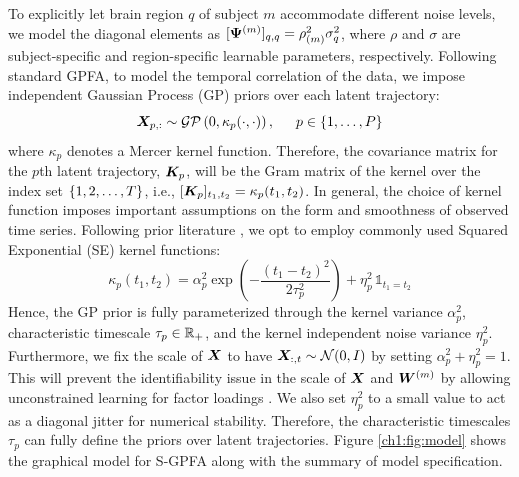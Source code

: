 To explicitly let brain region $q$ of subject $m$ accommodate different noise levels, we model the diagonal elements as $[\bm{\Psi}^{(m)}]_{q, q} = \rho_{(m)}^2 \sigma_{q}^2$, where $\rho$ and $\sigma$ are subject-specific and region-specific learnable parameters, respectively. Following standard GPFA, to model the temporal correlation of the data, we impose independent Gaussian Process (GP) priors over each latent trajectory:
\begin{equation}
    \bm{X}_{p, :} \sim \mathcal{GP}\left(0, \kappa_p(\cdot , \cdot) \right), \hspace{1.5em} p \in \{1, \ldots, P\}
\end{equation}
where $\kappa_p$ denotes a Mercer kernel function. Therefore, the covariance matrix for the $p$th latent trajectory, $\bm{K}_p$, will be the Gram matrix of the kernel over the index set $\{1, 2, \ldots, T\}$, i.e., $[\bm{K}_p]_{t_1,t_2} = \kappa_p(t_1, t_2)$. In general, the choice of kernel function imposes important assumptions on the form and smoothness of observed time series. Following prior literature \cite{infraslow,lfgp}, we opt to employ commonly used Squared Exponential (SE) kernel functions:
\begin{equation}
    \kappa_p (t_1, t_2) = \alpha_p^2 \exp \left( -\frac{(t_1 - t_2)^2}{2\tau_p^2} \right) + \eta_p^2 \, \mathds{1}_{t_1=t_2}
\end{equation}
Hence, the GP prior is fully parameterized through the kernel variance $\alpha_p^2$, characteristic timescale $\tau_p \in \mathbb{R}_+$, and the kernel independent noise variance $\eta_p^2$. Furthermore, we fix the scale of $\bm{X}$ to have $\bm{X}_{:,t} \sim \mathcal{N}(0, I)$ by setting $\alpha_p^2 + \eta_p^2 = 1$. This will prevent the identifiability issue in the scale of $\bm{X}$ and $\bm{W}^{(m)}$ by allowing unconstrained learning for factor loadings \cite{gpfa, infraslow, lfgp}. We also set $\eta_p^2$ to a small value to act as a diagonal jitter for numerical stability. Therefore, the characteristic timescales $\tau_p$ can fully define the priors over latent trajectories. Figure \ref{ch1:fig:model} shows the graphical model for S-GPFA along with the summary of model specification.


